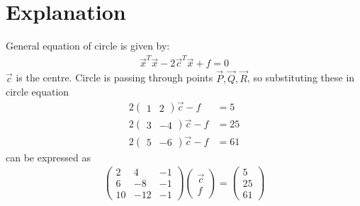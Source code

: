 \documentclass[journal,12pt,twocolumn]{IEEEtran}
\begin{document}
\section{Explanation}
General equation of circle is given by:\\
\begin{align}
    \vec{x}^T \vec{x} -2 \vec{c}^T \vec{x} + f = 0 
\end{align}   
$\vec{c}$ is the centre. Circle is passing through points $\vec{P}, \vec{Q}, \vec{R}$, so substituting these in circle equation
\begin{align}
    2 \begin{pmatrix} 1 & 2 \end{pmatrix} \vec{c} -f &= 5 \\
    2 \begin{pmatrix} 3 & -4 \end{pmatrix} \vec{c} -f &= 25 \\
    2 \begin{pmatrix} 5 & -6 \end{pmatrix} \vec{c} -f &= 61
\end{align}
can be expressed as 
\begin{align}
    \begin{pmatrix} 2 & 4 & -1 \\ 6 & -8 & -1 \\ 10 & -12 & -1 \end{pmatrix} \begin{pmatrix} \vec{c} \\ f \end{pmatrix} = \begin{pmatrix} 5 \\ 25 \\ 61 \end{pmatrix}
\end{align}
\end{document}
